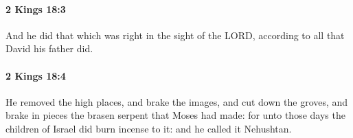 		\paragraph{2 Kings 18:3} %
			\label{2KINGS-18-3}

			And he did that which was right in the sight of the LORD, according to all that David his father did.


		\paragraph{2 Kings 18:4} %
			\label{2KINGS-18-4}

			He removed the high places, and brake the images, and cut down the groves, and brake in pieces the brasen serpent that Moses had made: for unto those days the children of Israel did burn incense to it: and he called it Nehushtan.


